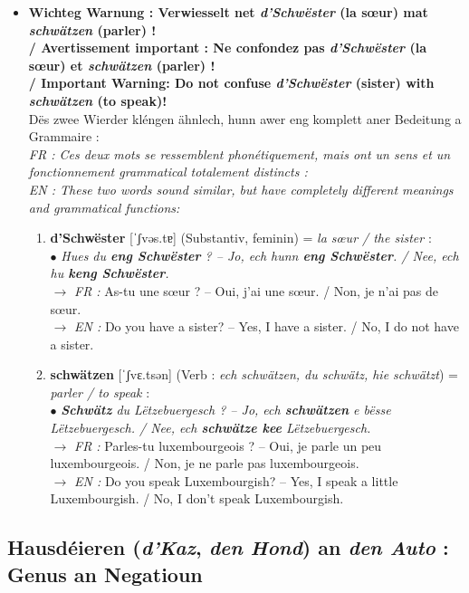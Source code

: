 \begin{itemize}
    \item \textbf{Wichteg Warnung : Verwiesselt net \textit{d'Schwëster} (la sœur) mat \textit{schwätzen} (parler) ! \\
    / Avertissement important : Ne confondez pas \textit{d'Schwëster} (la sœur) et \textit{schwätzen} (parler) ! \\
    / Important Warning: Do not confuse \textit{d'Schwëster} (sister) with \textit{schwätzen} (to speak)!} \\
    Dës zwee Wierder kléngen ähnlech, hunn awer eng komplett aner Bedeitung a Grammaire : \\
    \textit{FR : Ces deux mots se ressemblent phonétiquement, mais ont un sens et un fonctionnement grammatical totalement distincts :} \\
    \textit{EN : These two words sound similar, but have completely different meanings and grammatical functions:}
    \begin{enumerate}
        \item \textbf{d'Schwëster} {[ˈʃvəs.tɐ]} (Substantiv, feminin) = \textit{la sœur / the sister} : \\
        $\bullet$ \textit{Hues du \textbf{eng Schwëster} ? -- Jo, ech hunn \textbf{eng Schwëster}. / Nee, ech hu \textbf{keng Schwëster}.} \\
        $\rightarrow$ \textit{FR :} As-tu une sœur ? -- Oui, j'ai une sœur. / Non, je n'ai pas de sœur. \\
        $\rightarrow$ \textit{EN :} Do you have a sister? -- Yes, I have a sister. / No, I do not have a sister.
        \item \textbf{schwätzen} {[ˈʃvɛ.tsən]} (Verb : \textit{ech schwätzen, du schwätz, hie schwätzt}) = \textit{parler / to speak} : \\
        $\bullet$ \textit{\textbf{Schwätz} du Lëtzebuergesch ? -- Jo, ech \textbf{schwätzen} e bësse Lëtzebuergesch. / Nee, ech \textbf{schwätze kee} Lëtzebuergesch.} \\
        $\rightarrow$ \textit{FR :} Parles-tu luxembourgeois ? -- Oui, je parle un peu luxembourgeois. / Non, je ne parle pas luxembourgeois. \\
        $\rightarrow$ \textit{EN :} Do you speak Luxembourgish? -- Yes, I speak a little Luxembourgish. / No, I don't speak Luxembourgish.
    \end{enumerate}
\end{itemize}

\subsection{Hausdéieren (\textit{d'Kaz}, \textit{den Hond}) an \textit{den Auto} : Genus an Negatioun}

